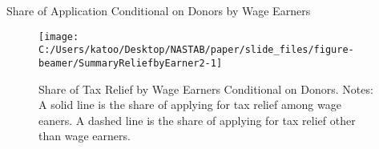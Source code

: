 \documentclass[
  ignorenonframetext,
  aspectratio=169,
]{beamer}
\begin{document}
\begin{frame}{Share of Application Conditional on Donors by Wage Earners}
\protect\hypertarget{share-of-application-conditional-on-donors-by-wage-earners}{}
\begin{figure}[t]

{\centering \texttt{[image: C:/Users/katoo/Desktop/NASTAB/paper/slide\_files/figure-beamer/SummaryReliefbyEarner2-1]} 

}

\caption{Share of Tax Relief by Wage Earners Conditional on Donors. Notes: A solid line is the share of applying for tax relief among wage eaners. A dashed line is the share of applying for tax relief other than wage earners.}\label{fig:SummaryReliefbyEarner2}
\end{figure}
\end{frame}
\end{document}
